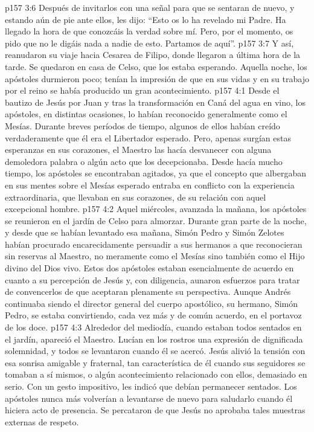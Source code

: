 \vs p157 3:6 Después de invitarlos con una señal para que se sentaran de nuevo, y estando aún de pie ante ellos, les dijo: “Esto os lo ha revelado mi Padre. Ha llegado la hora de que conozcáis la verdad sobre mí. Pero, por el momento, os pido que no le digáis nada a nadie de esto. Partamos de aquí”.
\vs p157 3:7 Y así, reanudaron su viaje hacia Cesarea de Filipo, donde llegaron a última hora de la tarde. Se quedaron en casa de Celso, que los estaba esperando. Aquella noche, los apóstoles durmieron poco; tenían la impresión de que en sus vidas y en su trabajo por el reino se había producido un gran acontecimiento.
\vs p157 4:1 Desde el bautizo de Jesús por Juan y tras la transformación en Caná del agua en vino, los apóstoles, en distintas ocasiones, lo habían reconocido generalmente como el Mesías. Durante breves períodos de tiempo, algunos de ellos habían creído verdaderamente que él era el Libertador esperado. Pero, apenas surgían estas esperanzas en sus corazones, el Maestro las hacía desvanecer con alguna demoledora palabra o algún acto que los decepcionaba. Desde hacía mucho tiempo, los apóstoles se encontraban agitados, ya que el concepto que albergaban en sus mentes sobre el Mesías esperado entraba en conflicto con la experiencia extraordinaria, que llevaban en sus corazones, de su relación con aquel excepcional hombre.
\vs p157 4:2 Aquel miércoles, avanzada la mañana, los apóstoles se reunieron en el jardín de Celso para almorzar. Durante gran parte de la noche, y desde que se habían levantado esa mañana, Simón Pedro y Simón Zelotes habían procurado encarecidamente persuadir a sus hermanos a que reconocieran sin reservas al Maestro, no meramente como el Mesías sino también como el Hijo divino del Dios vivo. Estos dos apóstoles estaban esencialmente de acuerdo en cuanto a su percepción de Jesús y, con diligencia, aunaron esfuerzos para tratar de convencerlos de que aceptaran plenamente su perspectiva. Aunque Andrés continuaba siendo el director general del cuerpo apostólico, su hermano, Simón Pedro, se estaba convirtiendo, cada vez más y de común acuerdo, en el portavoz de los doce.
\vs p157 4:3 Alrededor del mediodía, cuando estaban todos sentados en el jardín, apareció el Maestro. Lucían en los rostros una expresión de dignificada solemnidad, y todos se levantaron cuando él se acercó. Jesús alivió la tensión con esa sonrisa amigable y fraternal, tan característica de él cuando sus seguidores se tomaban a sí mismos, o algún acontecimiento relacionado con ellos, demasiado en serio. Con un gesto impositivo, les indicó que debían permanecer sentados. Los apóstoles nunca más volverían a levantarse de nuevo para saludarlo cuando él hiciera acto de presencia. Se percataron de que Jesús no aprobaba tales muestras externas de respeto.
